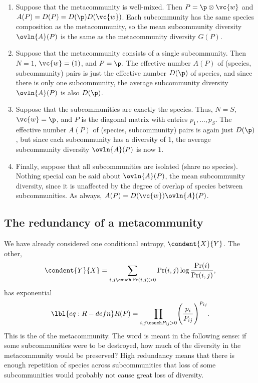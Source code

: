 \begin{examples}
\begin{enumerate}
\item
{}
Suppose that the metacommunity is well-mixed.
Then $P = \p \otimes \vc{w}$ and $A(P) = D(P) = D(\p)D(\vc{w})$.  Each
subcommunity has the same species composition as the metacommunity, so the
mean subcommunity diversity $\ovln{A}(P)$ is the same as the metacommunity
diversity $G(P)$.  

\item
{}
Suppose that the metacommunity consists of a single subcommunity.  Then $N
= 1$, $\vc{w} = (1)$, and $P = \p$.  The effective number $A(P)$ of
(species, subcommunity) pairs is just the effective number $D(\p)$ of
species, and since there is only one subcommunity, the average subcommunity
diversity $\ovln{A}(P)$ is also $D(\p)$.

\item
{}
Suppose that the subcommunities are exactly the species.  Thus, $N = S$,
$\vc{w} = \p$, and $P$ is the diagonal matrix with entries $p_1, \ldots,
p_S$.  The effective number $A(P)$ of (species, subcommunity) pairs is again
just $D(\p)$, but since each subcommunity has a diversity of $1$, the
average subcommunity diversity $\ovln{A}(P)$ is now $1$.  

\item
{}
Finally, suppose that all subcommunities are isolated (share no species).
Nothing special can be said about $\ovln{A}(P)$, the mean subcommunity
diversity, since it is unaffected by the degree of overlap of species
between subcommunities.  As always, $A(P) = D(\vc{w})\ovln{A}(P)$.
\end{enumerate}
\end{examples}


\subsection*{The redundancy of a metacommunity}

We have already considered one conditional%
%
% 
entropy, $\condent{X}{Y}$.  The other,
\[
\condent{Y}{X}
=
\sum_{i, j \csuch \Pr(i, j) > 0} 
\Pr(i, j) \log \frac{\Pr(i)}{\Pr(i, j)},
\]
has exponential
% 
\begin{equation}
\lbl{eq:R-defn}
R(P) = 
\prod_{i, j \csuch P_{ij} > 0} 
\Biggl( \frac{p_i}{P_{ij}} \Biggr)^{P_{ij}}.
\end{equation}
% 
This is the  of the metacommunity.  The word is meant in
the following sense: if some subcommunities were to be destroyed,%
%
%  
how much of the diversity in the metacommunity would be preserved?  High
redundancy means that there is enough repetition of species across
subcommunities that loss of some subcommunities would probably not
cause great loss of diversity.


